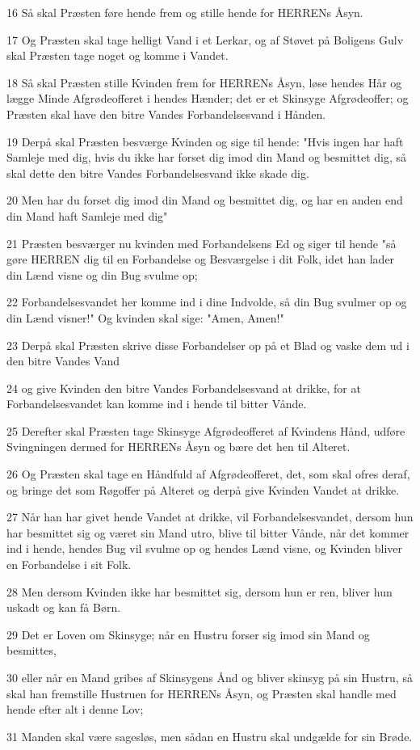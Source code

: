 \par 16 Så skal Præsten føre hende frem og stille hende for HERRENs Åsyn.
\par 17 Og Præsten skal tage helligt Vand i et Lerkar, og af Støvet på Boligens Gulv skal Præsten tage noget og komme i Vandet.
\par 18 Så skal Præsten stille Kvinden frem for HERRENs Åsyn, løse hendes Hår og lægge Minde Afgrødeofferet i hendes Hænder; det er et Skinsyge Afgrødeoffer; og Præsten skal have den bitre Vandes Forbandelsesvand i Hånden.
\par 19 Derpå skal Præsten besværge Kvinden og sige til hende: "Hvis ingen har haft Samleje med dig, hvis du ikke har forset dig imod din Mand og besmittet dig, så skal dette den bitre Vandes Forbandelsesvand ikke skade dig.
\par 20 Men har du forset dig imod din Mand og besmittet dig, og har en anden end din Mand haft Samleje med dig"
\par 21 Præsten besværger nu kvinden med Forbandelsens Ed og siger til hende "så gøre HERREN dig til en Forbandelse og Besværgelse i dit Folk, idet han lader din Lænd visne og din Bug svulme op;
\par 22 Forbandelsesvandet her komme ind i dine Indvolde, så din Bug svulmer op og din Lænd visner!" Og kvinden skal sige: "Amen, Amen!"
\par 23 Derpå skal Præsten skrive disse Forbandelser op på et Blad og vaske dem ud i den bitre Vandes Vand
\par 24 og give Kvinden den bitre Vandes Forbandelsesvand at drikke, for at Forbandelsesvandet kan komme ind i hende til bitter Vånde.
\par 25 Derefter skal Præsten tage Skinsyge Afgrødeofferet af Kvindens Hånd, udføre Svingningen dermed for HERRENs Åsyn og bære det hen til Alteret.
\par 26 Og Præsten skal tage en Håndfuld af Afgrødeofferet, det, som skal ofres deraf, og bringe det som Røgoffer på Alteret og derpå give Kvinden Vandet at drikke.
\par 27 Når han har givet hende Vandet at drikke, vil Forbandelsesvandet, dersom hun har besmittet sig og været sin Mand utro, blive til bitter Vånde, når det kommer ind i hende, hendes Bug vil svulme op og hendes Lænd visne, og Kvinden bliver en Forbandelse i sit Folk.
\par 28 Men dersom Kvinden ikke har besmittet sig, dersom hun er ren, bliver hun uskadt og kan få Børn.
\par 29 Det er Loven om Skinsyge; når en Hustru forser sig imod sin Mand og besmittes,
\par 30 eller når en Mand gribes af Skinsygens Ånd og bliver skinsyg på sin Hustru, så skal han fremstille Hustruen for HERRENs Åsyn, og Præsten skal handle med hende efter alt i denne Lov;
\par 31 Manden skal være sagesløs, men sådan en Hustru skal undgælde for sin Brøde.

